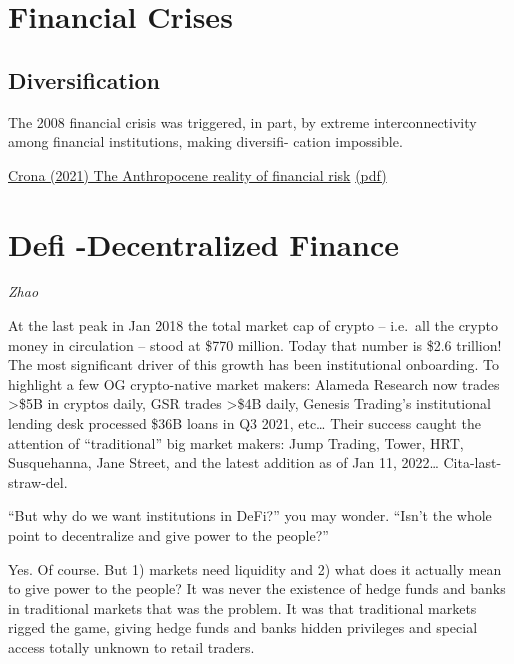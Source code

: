 \documentclass[
]{book}
\begin{document}
\hypertarget{financial-crises}{%
\chapter{Financial Crises}\label{financial-crises}}

\hypertarget{diversification}{%
\section{Diversification}\label{diversification}}

The 2008 financial crisis was triggered, in part, by extreme
interconnectivity among financial institutions, making diversifi-
cation impossible.

\href{https://www.sciencedirect.com/science\%20/article/pii/S2590332221002359\#undfig1}{Crona (2021) The Anthropocene reality of financial risk}
\href{pdf/Crona_2021_Anthropocene_reality_of\%20Financial_Risk.pdf}{(pdf)}

\hypertarget{defi--decentralized-finance}{%
\chapter{Defi -Decentralized Finance}\label{defi--decentralized-finance}}

\emph{Zhao}

At the last peak in Jan 2018 the total market cap of crypto -- i.e.~all the crypto money in circulation -- stood at \$770 million. Today that number is \$2.6 trillion! The most significant driver of this growth has been institutional onboarding. To highlight a few OG crypto-native market makers: Alameda Research now trades \textgreater\$5B in cryptos daily, GSR trades \textgreater\$4B daily, Genesis Trading's institutional lending desk processed \$36B loans in Q3 2021, etc\ldots{} Their success caught the attention of ``traditional'' big market makers: Jump Trading, Tower, HRT, Susquehanna, Jane Street, and the latest addition as of Jan 11, 2022\ldots{} Cita-last-straw-del.

``But why do we want institutions in DeFi?'' you may wonder. ``Isn't the whole point to decentralize and give power to the people?''

Yes. Of course. But 1) markets need liquidity and 2) what does it actually mean to give power to the people? It was never the existence of hedge funds and banks in traditional markets that was the problem. It was that traditional markets rigged the game, giving hedge funds and banks hidden privileges and special access totally unknown to retail traders.
\end{document}

